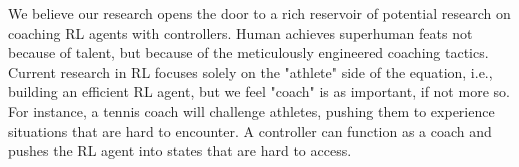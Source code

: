 \documentclass[journal]{IEEEtran}
\begin{document}
We believe our research opens the door to a rich reservoir of potential research on coaching RL agents with controllers. Human achieves superhuman feats not because of talent, but because of the meticulously engineered coaching tactics. Current research in RL focuses solely on the "athlete" side of the equation, i.e., building an efficient RL agent, but we feel "coach" is as important, if not more so.  For instance, a tennis coach will challenge athletes, pushing them to experience situations that are hard to encounter. A controller can function as a coach and pushes the RL agent into states that are hard to access. 


\end{document}
